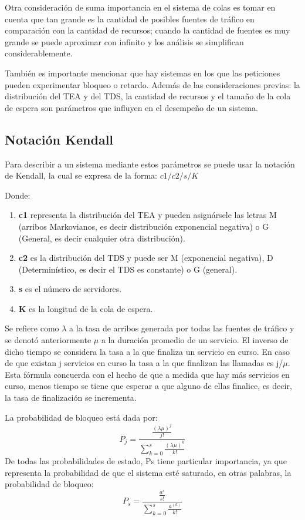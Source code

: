  Otra consideración de suma importancia en el sistema de colas es tomar en cuenta que tan grande es la cantidad de posibles fuentes de tráfico en comparación con la cantidad de recursos; cuando la cantidad de fuentes es muy grande se puede aproximar con infinito y los análisis se simplifican considerablemente.\newline

 También es importante mencionar que hay sistemas en los que las peticiones pueden experimentar bloqueo o retardo. Además de las consideraciones previas: la distribución del TEA y del TDS, la cantidad de recursos y el tamaño de la cola de espera son parámetros que influyen en el desempeño de un sistema.

 \subsection{Notación Kendall}

 Para describir a un sistema mediante estos parámetros se puede usar la notación de Kendall, la cual se expresa de la forma:
$c1/ c2/ s/ K$

 Donde:
\begin{enumerate}
    \item  \textbf{c1} representa la distribución del TEA y pueden asignársele las letras M (arribos Markovianos, es decir distribución exponencial negativa) o G (General, es decir cualquier otra distribución).
    \item  \textbf{c2} es la distribución del TDS y puede ser M (exponencial negativa), D (Determinístico, es decir el TDS es constante) o G (general).
    \item  \textbf{s} es el número de servidores.
    \item  \textbf{K} es la longitud de la cola de espera.
\end{enumerate}

 Se refiere como $\lambda$ a la tasa de arribos generada por todas las fuentes de tráfico y se denotó anteriormente $\mu$ a la duración promedio de un servicio. El inverso de dicho tiempo se considera la tasa a la que finaliza un servicio en curso. En caso de que existan j servicios en curso la tasa a la que finalizan las llamadas es j/$\mu$. Esta fórmula concuerda con el hecho de que a medida que hay más servicios en curso, menos tiempo se tiene que esperar a que alguno de ellas finalice, es decir, la tasa de finalización se incrementa.

 La probabilidad de bloqueo está dada por:
\begin{equation}
    P_{j}=\frac{\frac{(\lambda\mu)^{j}}{j!}}{\sum_{k=0}^{s}\frac{(\lambda\mu)^{k}}{k!}}
    \label{eqn:Pb}
\end{equation} 
De todas las probabilidades de estado, Ps tiene particular importancia, ya que representa la probabilidad de que el sistema esté saturado, en otras palabras, la probabilidad de bloqueo:
\begin{equation}
    P_{s}=\frac{\frac{a^{s}}{s!}}{\sum_{k=0}^{s}\frac{a^(k)}{k!}}
    \label{eqn:Ps}
\end{equation} 

